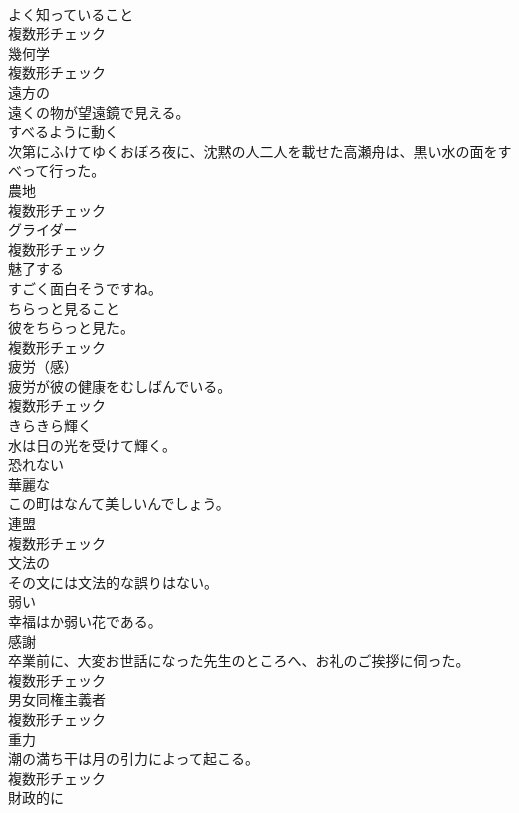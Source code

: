 \documentclass[8pt]{extreport}
\begin{document}
\begin{CJK}{UTF8}{min}
\\	[名詞]	よく知っていること	
\\	複数形チェック
\\	[名詞]	幾何学	
\\	複数形チェック
\\	[形容詞]	遠方の	
\\	遠くの物が望遠鏡で見える。	
\\	[動詞]	すべるように動く	
\\	次第にふけてゆくおぼろ夜に、沈黙の人二人を載せた高瀬舟は、黒い水の面をすべって行った。	
\\	[名詞]	農地	
\\	複数形チェック
\\	[名詞]	グライダー	
\\	複数形チェック
\\	[動詞]	魅了する	
\\	すごく面白そうですね。	
\\	[名詞]	ちらっと見ること	
\\	彼をちらっと見た。	
\\	複数形チェック
\\	[名詞]	疲労（感）	
\\	疲労が彼の健康をむしばんでいる。	
\\	複数形チェック
\\	[動詞]	きらきら輝く	
\\	水は日の光を受けて輝く。	
\\	[形容詞]	恐れない	
\\	[形容詞]	華麗な	
\\	この町はなんて美しいんでしょう。	
\\	[名詞]	連盟	
\\	複数形チェック
\\	[形容詞]	文法の	
\\	その文には文法的な誤りはない。	
\\	[形容詞]	弱い	
\\	幸福はか弱い花である。	
\\	[名詞]	感謝	
\\	卒業前に、大変お世話になった先生のところへ、お礼のご挨拶に伺った。	
\\	複数形チェック
\\	[名詞]	男女同権主義者	
\\	複数形チェック
\\	[名詞]	重力	
\\	潮の満ち干は月の引力によって起こる。	
\\	複数形チェック
\\	[副詞]	財政的に	

\end{CJK}
\end{document}
